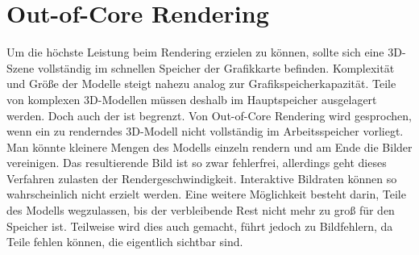 \section{Out-of-Core Rendering}
\label{sec:relwork:oocrender}
Um die höchste Leistung beim Rendering erzielen zu können, sollte sich eine 3D-Szene vollständig im schnellen Speicher der Grafikkarte befinden. Komplexität und Größe der Modelle steigt nahezu analog zur Grafikspeicherkapazität. Teile von komplexen 3D-Modellen müssen deshalb im Hauptspeicher ausgelagert werden. Doch auch der ist begrenzt. Von Out-of-Core Rendering wird gesprochen, wenn ein zu renderndes 3D-Modell nicht vollständig im Arbeitsspeicher vorliegt. Man könnte kleinere Mengen des Modells einzeln rendern und am Ende die Bilder vereinigen. Das resultierende Bild ist so zwar fehlerfrei, allerdings geht dieses Verfahren zulasten der Rendergeschwindigkeit. Interaktive Bildraten können so wahrscheinlich nicht erzielt werden. Eine weitere Möglichkeit besteht darin, Teile des Modells wegzulassen, bis der verbleibende Rest nicht mehr zu groß für den Speicher ist. Teilweise wird dies auch gemacht, führt jedoch zu Bildfehlern, da Teile fehlen können, die eigentlich sichtbar sind.


